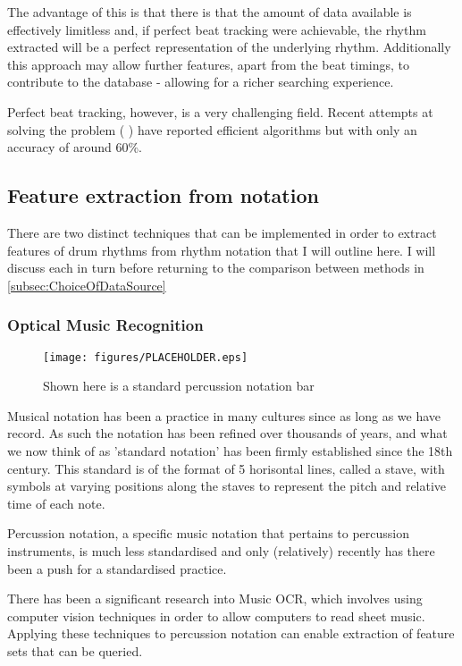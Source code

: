 \documentclass[12pt,twoside,notitlepage]{report}
\begin{document}
		The advantage of this is that there is that the amount of data available is effectively limitless and, if perfect beat tracking were achievable, the rhythm extracted will be a perfect representation of the underlying rhythm. Additionally this approach may allow further features, apart from the beat timings, to contribute to the database - allowing for a richer searching experience.
		
		Perfect beat tracking, however, is a very challenging field. Recent attempts at solving the problem (\cite{Ellis2007} \cite{EllisPoliner2007} \cite{DaviesPlumbley2007}) have reported efficient algorithms but with only an accuracy of around 60\%.
		\subsection{Feature extraction from notation}
		There are two distinct techniques that can be implemented in order to extract features of drum rhythms from rhythm notation that I will outline here. I will discuss each in turn before returning to the comparison between methods in \ref{subsec:ChoiceOfDataSource}
			\subsubsection{Optical Music Recognition}
			\begin{figure}[h]
			\centerline{\texttt{[image: figures/PLACEHOLDER.eps]}}
			\caption{\label{PercussionNotation} Shown here is a standard percussion notation bar}
\end{figure}
		Musical notation has been a practice in many cultures since as long as we have record\cite{Scelta}. As such the notation has been refined over thousands of years, and what we now think of as 'standard notation' has been firmly established since the 18th century\cite{Scelta}. This standard is of the format of 5 horisontal lines, called a stave, with symbols at varying positions along the staves to represent the pitch and relative time of each note.
		
		Percussion notation, a specific music notation that pertains to percussion instruments, is much less standardised and only (relatively) recently has there been a push for a standardised practice\cite{Weinberg1994}.
		
		There has been a significant research\cite{Johansen2009}\cite{BainbridgeBell2001} into Music OCR\footnotemark {}, which involves using computer vision techniques in order to allow computers to read sheet music. Applying these techniques to percussion notation can enable extraction of feature sets that can be queried.
		
\end{document}
